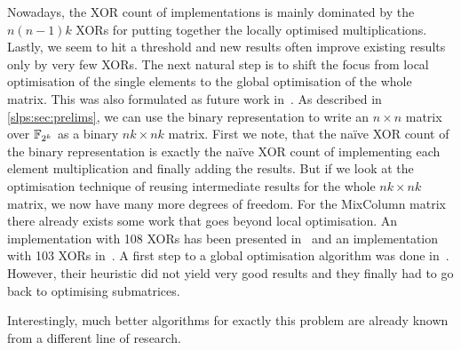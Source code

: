 Nowadays, the XOR count of implementations is mainly dominated by the $n(n-1)k$ XORs for putting together the locally optimised multiplications.
Lastly, we seem to hit a threshold and new results often improve existing results only by very few XORs.
The next natural step is to shift the focus from local optimisation of the single elements to the global optimisation of the whole matrix.
This was also formulated as future work in~\cite{ToSC:JPST17}.
As described in \cref{slps:sec:prelims}, we can use the binary representation to write an $n \times n$ matrix over $\mathbb{F}_{2^k}$ as a binary $nk \times nk$ matrix.
First we note, that the na\"ive XOR count of the binary representation is exactly the na\"ive XOR count of implementing each element multiplication and finally adding the results.
But if we look at the optimisation technique of reusing intermediate results for the whole $nk \times nk$ matrix, we now have many more degrees of freedom.
For the MixColumn matrix there already exists some work that goes beyond local optimisation.
An implementation with 108 XORs has been presented in~ and an implementation with 103 XORs in~\cite{CHES:JMPS17}.
A first step to a global optimisation algorithm was done in~\cite{EPRINT:ZWZZ16}.
However, their heuristic did not yield very good results and they finally had to go back to optimising submatrices.

Interestingly, much better algorithms for exactly this problem are already known from a different line of research.

